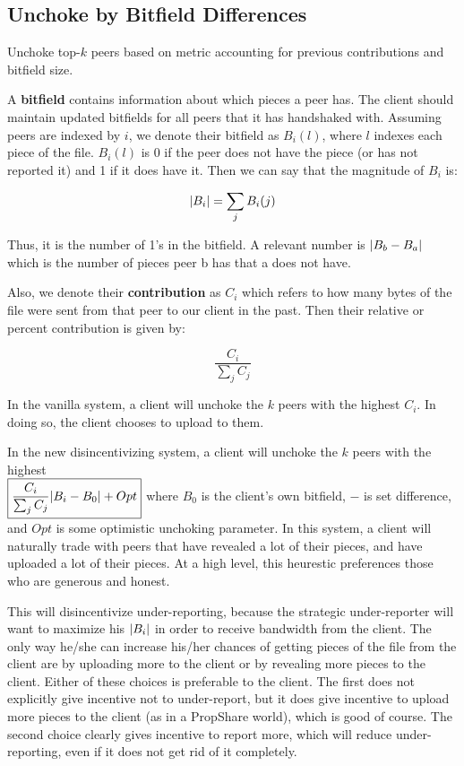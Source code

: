 \subsection{Unchoke by Bitfield Differences}

Unchoke top-$k$ peers based on metric accounting for previous contributions and bitfield size.

A \textbf{bitfield} contains information about which pieces a peer has. The client should maintain updated bitfields for all peers that it has handshaked with. Assuming peers are indexed by $i$, we denote their bitfield as $B_i(l)$, where $l$ indexes each piece of the file. $B_i(l)$ is 0 if the peer does not have the piece (or has not reported it) and 1 if it does have it. Then we can say that the magnitude of $B_i$ is:

$$ \lvert B_i\rvert = \sum_j B_i(j) $$

Thus, it is the number of 1's in the bitfield. A relevant number is $\lvert B_b - B_a\rvert$ which is the number of pieces peer b has that a does not have.

Also, we denote their \textbf{contribution} as $C_i$ which refers to how many bytes of the file were sent from that peer to our client in the past. Then their relative or percent contribution is given by:

$$ \frac{C_i}{\sum_{j}C_j} $$

In the vanilla system, a client will unchoke the $k$ peers with the highest $C_i$. In doing so, the client chooses to upload to them.

In the new disincentivizing system, a client will unchoke the $k$ peers with the highest \\ $\boxed{\frac{C_i}{\sum_{j}C_j}\lvert B_i - B_0\rvert + Opt}$ where $B_0$ is the client's own bitfield, $-$ is set difference, and $Opt$ is some optimistic unchoking parameter. In this system, a client will naturally trade with peers that have revealed a lot of their pieces, and have uploaded a lot of their pieces. At a high level, this heurestic preferences those who are generous and honest.

This will disincentivize under-reporting, because the strategic under-reporter will want to maximize his $\lvert B_i\rvert$ in order to receive bandwidth from the client. The only way he/she can increase his/her chances of getting pieces of the file from the client are by uploading more to the client or by revealing more pieces to the client. Either of these choices is preferable to the client. The first does not explicitly give incentive not to under-report, but it does give incentive to upload more pieces to the client (as in a PropShare world), which is good of course. The second choice clearly gives incentive to report more, which will reduce under-reporting, even if it does not get rid of it completely.

